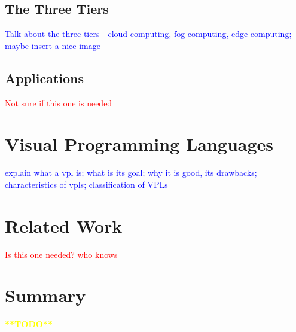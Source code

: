\subsection{The Three Tiers}\label{sec:three_tiers}

\textcolor{blue}{Talk about the three tiers - cloud computing, fog computing, edge computing; maybe insert a nice image}

\subsection{Applications}\label{sec:iot_applications}

\textcolor{red}{Not sure if this one is needed}

\section{Visual Programming Languages}\label{sec:background_vpl}

\textcolor{blue}{explain what a vpl is; what is its goal; why it is good, its drawbacks; characteristics of vpls; classification of VPLs}

\section{Related Work}

\textcolor{red}{Is this one needed? who knows}

\section{Summary}

\textcolor{yellow}{\textbf{**TODO**}}

